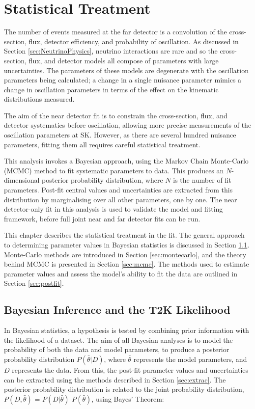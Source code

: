 \chapter{Statistical Treatment}\label{sec:stats}

The number of events measured at the far detector is a convolution of the cross-section, flux, detector efficiency, and probability of oscillation. As discussed in Section \ref{sec:NeutrinoPhysics}, neutrino interactions are rare and so the cross-section, flux, and detector models all compose of parameters with large uncertainties. The parameters of these models are degenerate with the oscillation parameters being calculated; a change in a single nuisance parameter mimics a change in oscillation parameters in terms of the effect on the kinematic distributions measured.

The aim of the near detector fit is to constrain the cross-section, flux, and detector systematics before oscillation, allowing more precise measurements of the oscillation parameters at SK. However, as there are several hundred nuisance parameters, fitting them all requires careful statistical treatment.

This analysis invokes a Bayesian approach, using the Markov Chain Monte-Carlo (MCMC) method to fit systematic parameters to data. This produces an $N$-dimensional posterior probability distribution, where $N$ is the number of fit parameters. Post-fit central values and uncertainties are extracted from this distribution by marginalising over all other parameters, one by one. The near detector-only fit in this analysis is used to validate the model and fitting framework, before full joint near and far detector fits can be run. 

This chapter describes the statistical treatment in the fit. The general approach to determining parameter values in Bayesian statistics is discussed in Section \ref{sec:bayes}. Monte-Carlo methods are introduced in Section \ref{sec:montecarlo}, and the theory behind MCMC is presented in Section \ref{sec:mcmc}. The methods used to estimate parameter values and assess the model's ability to fit the data are outlined in Section \ref{sec:postfit}.

\section{Bayesian Inference and the T2K Likelihood}\label{sec:bayes}

In Bayesian statistics, a hypothesis is tested by combining prior information with the likelihood of a dataset. The aim of all Bayesian analyses is to model the probability of both the data and model parameters, to produce a posterior probability distribution $P(\bar{\theta}|D)$, where $\bar{\theta}$ represents the model parameters, and $D$ represents the data. From this, the post-fit parameter values and uncertainties can be extracted using the methods described in Section \ref{sec:extrac}. The posterior probability distribution is related to the joint probability distribution, $P(D,\bar{\theta})$ = $P(D|\bar{\theta})$ $P(\bar{\theta})$, using Bayes' Theorem:

